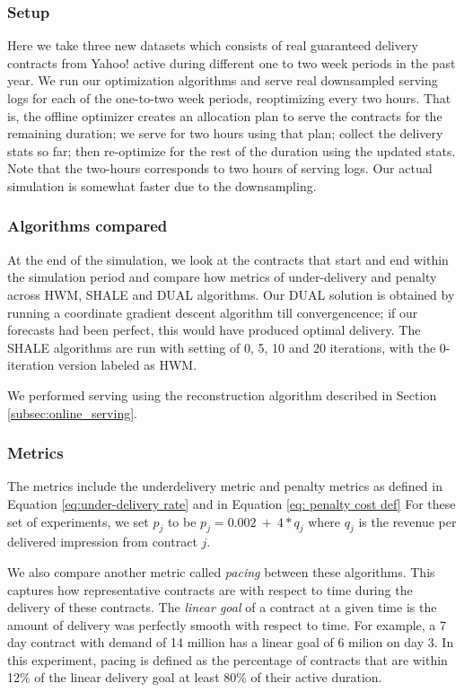 \subsubsection{Setup}
Here we take three new datasets which consists of real guaranteed delivery contracts 
from Yahoo! active during different one to two week periods in the past year. We 
run our optimization algorithms and serve real downsampled serving logs for 
each of the one-to-two week periods, reoptimizing every two hours.  That is,
the offline optimizer creates an allocation plan to serve the contracts for the remaining
duration; we serve for two hours using that plan; collect the delivery stats so far;
then re-optimize for the rest of the duration using the updated stats.  Note that the
two-hours corresponds to two hours of serving logs.  Our actual simulation is somewhat
faster due to the downsampling.

\subsubsection{Algorithms compared}
At the end of the simulation, we look at the contracts that start and end within 
the simulation period and compare how metrics of under-delivery and penalty across 
HWM, SHALE and DUAL algorithms.  
Our DUAL solution is obtained by running a coordinate gradient descent algorithm 
till convergencence; if our forecasts had been perfect, this would have produced optimal
delivery.
The SHALE algorithms are run with setting of 0, 5, 10 and 20 iterations, with the 0-iteration
version labeled as HWM.

We performed serving using the reconstruction algorithm described in Section
\ref{subsec:online_serving}. 

\subsubsection{Metrics}
The metrics include the underdelivery metric and penalty metrics as defined in 
Equation \ref{eq:under-delivery rate} and in Equation \ref{eq: penalty cost def}
For these set of experiments, we set $p_j$ to be $p_j =
0.002 \ + \ 4*q_j$ where $q_j$ is the revenue per delivered
impression from contract $j$. 

We also compare another metric called {\em pacing} between these algorithms. This captures 
how representative contracts are with respect to time during the delivery of these contracts.
The {\em linear goal} of a contract at a given time is the amount of delivery was perfectly
smooth with respect to time.  For example, a 7 day contract with demand of 14 million has a linear
goal of 6 milion on day 3.
In this experiment, pacing is defined as the percentage of contracts that are within 12\% of the linear 
delivery goal at least 80\% of their active duration. 

